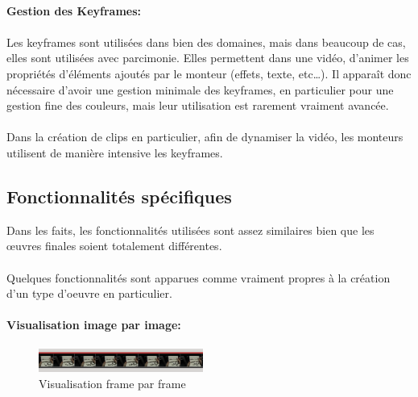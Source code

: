 \paragraph{Gestion des Keyframes:}

\paragraph{}

Les keyframes sont utilisées dans bien des domaines, mais dans beaucoup
de cas, elles sont utilisées avec parcimonie. Elles permettent dans une
vidéo, d'animer les propriétés d'éléments ajoutés par le monteur
(effets, texte, etc\ldots). Il apparaît donc nécessaire d'avoir une
gestion minimale des keyframes, en particulier pour une gestion fine
des couleurs, mais leur utilisation est rarement vraiment avancée.

\paragraph{}

Dans la création de clips en particulier, afin de dynamiser la vidéo,
les monteurs utilisent de manière intensive les keyframes.

\subsection{Fonctionnalités spécifiques} %

Dans les faits, les fonctionnalités utilisées sont assez similaires
bien que les œuvres finales soient totalement différentes.

\paragraph{}

Quelques fonctionnalités sont apparues comme vraiment propres à la
création d'un type d'oeuvre en particulier.

\paragraph{Visualisation image par image:}

\begin{figure}

    \begin{center}

      \includegraphics[width=0.48\textwidth]{images/frameByFrame}

    \end{center} \caption{Visualisation frame par frame} \label{Yes}

\end{figure}

